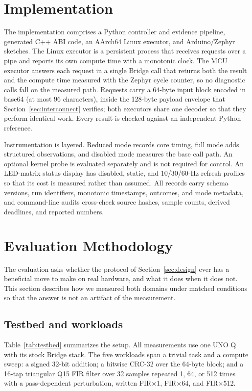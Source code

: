 \documentclass[conference]{IEEEtran}
\begin{document}
\section{Implementation}
\label{sec:impl}
The implementation comprises a Python controller and evidence pipeline,
generated C++ ABI code, an AArch64 Linux executor, and Arduino/Zephyr sketches.
The Linux executor is a persistent process that receives requests over a pipe
and reports its own compute time with a monotonic clock. The MCU executor
answers each request in a single Bridge call that returns both the result and
the compute time measured with the Zephyr cycle counter, so no diagnostic
calls fall on the measured path. Requests carry a 64-byte input block encoded
in base64 (at most 96 characters), inside the 128-byte payload envelope that
Section~\ref{sec:interconnect} verifies; both executors share one decoder so
that they perform identical work. Every result is checked against an
independent Python reference.

Instrumentation is layered. Reduced mode records core timing, full mode adds
structured observations, and disabled mode measures the base call path. An
optional kernel probe is evaluated separately and is not required for
control. An LED-matrix status display has disabled, static, and 10/30/60-Hz
refresh profiles so that its cost is measured rather than assumed. All
records carry schema versions, run identifiers, monotonic timestamps,
outcomes, and mode metadata, and command-line audits cross-check source
hashes, sample counts, derived deadlines, and reported numbers.

\section{Evaluation Methodology}
\label{sec:method}
The evaluation asks whether the protocol of Section~\ref{sec:design} ever has
a beneficial move to make on real hardware, and what it does when it does
not. This section describes how we measured both domains under matched
conditions so that the answer is not an artifact of the measurement.

\subsection{Testbed and workloads}
Table~\ref{tab:testbed} summarizes the setup. All measurements use one UNO Q with its stock Bridge stack.
The five workloads span a trivial task and a compute sweep: a signed 32-bit
addition; a bitwise CRC-32 over the 64-byte block; and a 16-tap triangular
Q15 FIR filter over 32 samples repeated 1, 64, or 512 times with a
pass-dependent perturbation, written FIR$\times$1, FIR$\times$64, and
FIR$\times$512.
\end{document}
